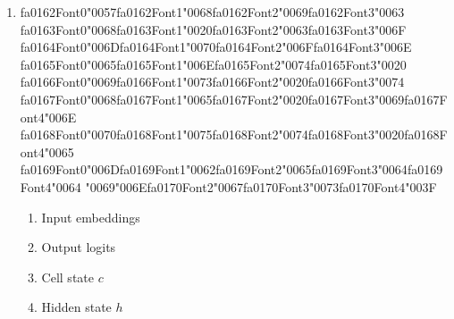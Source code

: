 \documentclass[12pt]{article}
\begin{document}
\begin{enumerate}[label=Q\arabic*.]
 \item {\csname fa0162Font0\endcsname\char"0057}{\csname fa0162Font1\endcsname\char"0068}{\csname fa0162Font2\endcsname\char"0069}{\csname fa0162Font3\endcsname\char"0063} {\csname fa0163Font0\endcsname\char"0068}{\csname fa0163Font1\endcsname\char"0020}{\csname fa0163Font2\endcsname\char"0063}{\csname fa0163Font3\endcsname\char"006F} {\csname fa0164Font0\endcsname\char"006D}{\csname fa0164Font1\endcsname\char"0070}{\csname fa0164Font2\endcsname\char"006F}{\csname fa0164Font3\endcsname\char"006E} {\csname fa0165Font0\endcsname\char"0065}{\csname fa0165Font1\endcsname\char"006E}{\csname fa0165Font2\endcsname\char"0074}{\csname fa0165Font3\endcsname\char"0020} {\csname fa0166Font0\endcsname\char"0069}{\csname fa0166Font1\endcsname\char"0073}{\csname fa0166Font2\endcsname\char"0020}{\csname fa0166Font3\endcsname\char"0074} {\csname fa0167Font0\endcsname\char"0068}{\csname fa0167Font1\endcsname\char"0065}{\csname fa0167Font2\endcsname\char"0020}{\csname fa0167Font3\endcsname\char"0069}{\csname fa0167Font4\endcsname\char"006E} {\csname fa0168Font0\endcsname\char"0070}{\csname fa0168Font1\endcsname\char"0075}{\csname fa0168Font2\endcsname\char"0074}{\csname fa0168Font3\endcsname\char"0020}{\csname fa0168Font4\endcsname\char"0065} {\csname fa0169Font0\endcsname\char"006D}{\csname fa0169Font1\endcsname\char"0062}{\csname fa0169Font2\endcsname\char"0065}{\csname fa0169Font3\endcsname\char"0064}{\csname fa0169Font4\endcsname\char"0064} {\char"0069}{\char"006E}{\csname fa0170Font2\endcsname\char"0067}{\csname fa0170Font3\endcsname\char"0073}{\csname fa0170Font4\endcsname\char"003F}
 \begin{enumerate}[label=(\Alph*)]
     \item Input embeddings
     \item Output logits
     \item Cell state $c$
     \item Hidden state $h$
 \end{enumerate}
 

\end{enumerate}
\end{document}
